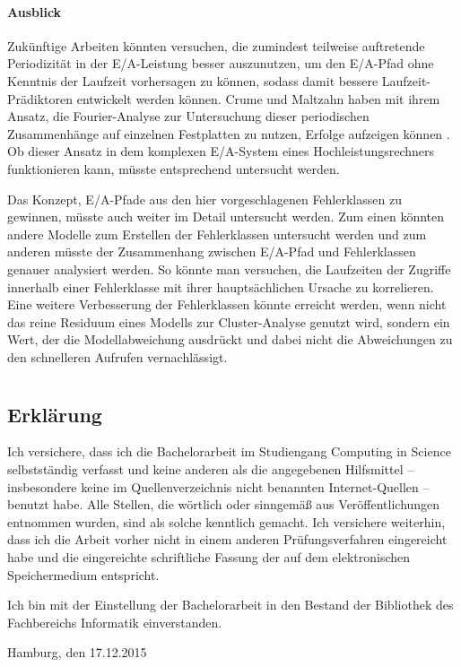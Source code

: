 \documentclass[
	twoside,
	12pt,
	a4paper,
	BCOR10mm,
	DIV14,
	listof=totoc,
	bibliography=totoc,
	headsepline
]{scrreprt}
\begin{document}
\subsubsection{Ausblick}
Zukünftige Arbeiten könnten versuchen, die zumindest teilweise auftretende Periodizität in der E/A-Leistung besser auszunutzen, um den E/A-Pfad ohne Kenntnis der Laufzeit vorhersagen zu können, sodass damit bessere Laufzeit-Prädiktoren entwickelt werden können. 
Crume und Maltzahn haben mit ihrem Ansatz, die Fourier-Analyse zur Untersuchung dieser periodischen Zusammenhänge auf einzelnen Festplatten zu nutzen, Erfolge aufzeigen können \cite{Crume:2013:FML:2538542.2538561}.
Ob dieser Ansatz in dem komplexen E/A-System eines Hochleistungsrechners funktionieren kann, müsste entsprechend untersucht werden.\medskip

Das Konzept, E/A-Pfade aus den hier vorgeschlagenen Fehlerklassen zu gewinnen, müsste auch weiter im Detail untersucht werden.
Zum einen könnten andere Modelle zum Erstellen der Fehlerklassen untersucht werden und zum anderen müsste der Zusammenhang zwischen E/A-Pfad und Fehlerklassen genauer analysiert werden. So könnte man versuchen, die Laufzeiten der Zugriffe innerhalb einer Fehlerklasse mit ihrer hauptsächlichen Ursache zu korrelieren.\\
Eine weitere Verbesserung der Fehlerklassen könnte erreicht werden, wenn nicht das reine Residuum eines Modells zur Cluster-Analyse genutzt wird, sondern ein Wert, der die Modellabweichung ausdrückt und dabei nicht die Abweichungen zu den schnelleren Aufrufen vernachlässigt.




\listoffigures

\listoftables

\newpage

\thispagestyle{empty}

\chapter*{}

\section*{Erklärung}

Ich versichere, dass ich die Bachelorarbeit im Studiengang Computing in Science
selbstständig verfasst und keine anderen als die angegebenen Hilfsmittel –
insbesondere keine im Quellenverzeichnis nicht benannten Internet-Quellen –
benutzt habe. Alle Stellen, die wörtlich oder sinngemäß aus Veröffentlichungen
entnommen wurden, sind als solche kenntlich gemacht. Ich versichere weiterhin,
dass ich die Arbeit vorher nicht in einem anderen Prüfungsverfahren eingereicht
habe und die eingereichte schriftliche Fassung der auf dem elektronischen
Speichermedium entspricht.\medskip

Ich bin mit der Einstellung der Bachelorarbeit in den Bestand der Bibliothek des Fachbereichs Informatik einverstanden.

\bigskip
\bigskip
\bigskip

Hamburg, den 17.12.2015  \quad \dotfill
\end{document}
